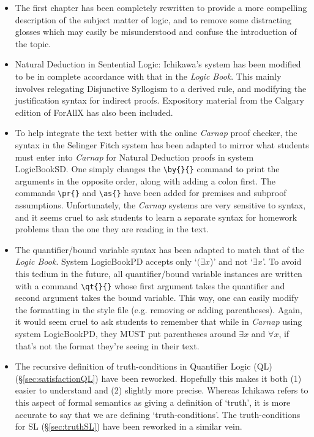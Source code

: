 \begin{itemize}

\item The first chapter has been completely rewritten to provide a more compelling description of the subject matter of logic, and to remove some distracting glosses which may easily be misunderstood and confuse the introduction of the topic.

\item Natural Deduction in Sentential Logic: Ichikawa's system has been modified to be in complete accordance with that in the \textit{Logic Book}.
  This mainly involves relegating Disjunctive Syllogism to a derived rule, and modifying the justification syntax for indirect proofs.
  Expository material from the Calgary edition of ForAllX has also been included.

\item To help integrate the text better with the online \textit{Carnap} proof checker, the syntax in the Selinger Fitch system has been adapted to mirror what students must enter into \textit{Carnap} for Natural Deduction proofs in system LogicBookSD.
  One simply changes the \verb|\by{}{}| command to print the arguments in the opposite order, along with adding a colon first.
  The commands \verb|\pr{}| and \verb|\as{}| have been added for premises and subproof assumptions.
  Unfortunately, the \textit{Carnap} systems are very sensitive to syntax, and it seems cruel to ask students to learn a separate syntax for homework problems than the one they are reading in the text. %

\item The quantifier/bound variable syntax has been adapted to match that of the \textit{Logic Book}.
  System LogicBookPD accepts only `$(\exists x$)' and not `$\exists x$'.
  To avoid this tedium in the future, all quantifier/bound variable instances are written with a command \verb|\qt{}{}| whose first argument takes the quantifier and second argument takes the bound variable.
  This way, one can easily modify the formatting in the style file (e.g. removing or adding parentheses).
  Again, it would seem cruel to ask students to remember that while in \textit{Carnap} using system LogicBookPD, they MUST put parentheses around $\exists x$ and $\forall x$, if that's not the format they're seeing in their text.

\item The recursive definition of truth-conditions in Quantifier Logic (QL) (\S\ref{sec:satisfactionQL}) have been reworked.
  Hopefully this makes it both (1) easier to understand and (2) slightly more precise.
  Whereas Ichikawa refers to this aspect of formal semantics as giving a definition of `truth', it is more accurate to say that we are defining `truth-conditions'.
  The truth-conditions for SL (\S\ref{sec:truthSL}) have been reworked in a similar vein.


\end{itemize}
